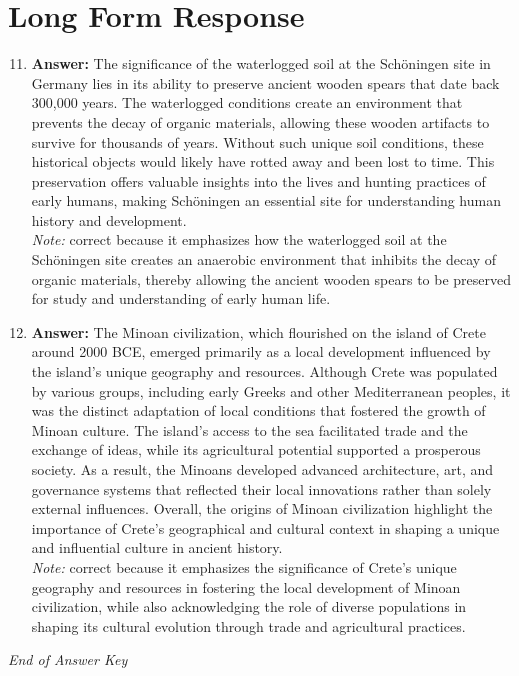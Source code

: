 \documentclass[12pt]{article}
\begin{document}
\section*{Long Form Response}
\begin{enumerate}[label=\arabic*.]
\setcounter{enumi}{10}
\item \textbf{Answer:} The significance of the waterlogged soil at the Schöningen site in Germany lies in its ability to preserve ancient wooden spears that date back 300,000 years. The waterlogged conditions create an environment that prevents the decay of organic materials, allowing these wooden artifacts to survive for thousands of years. Without such unique soil conditions, these historical objects would likely have rotted away and been lost to time. This preservation offers valuable insights into the lives and hunting practices of early humans, making Schöningen an essential site for understanding human history and development.
\\ \textit{Note:} correct because it emphasizes how the waterlogged soil at the Schöningen site creates an anaerobic environment that inhibits the decay of organic materials, thereby allowing the ancient wooden spears to be preserved for study and understanding of early human life.
\item \textbf{Answer:} The Minoan civilization, which flourished on the island of Crete around 2000 BCE, emerged primarily as a local development influenced by the island's unique geography and resources. Although Crete was populated by various groups, including early Greeks and other Mediterranean peoples, it was the distinct adaptation of local conditions that fostered the growth of Minoan culture. The island's access to the sea facilitated trade and the exchange of ideas, while its agricultural potential supported a prosperous society. As a result, the Minoans developed advanced architecture, art, and governance systems that reflected their local innovations rather than solely external influences. Overall, the origins of Minoan civilization highlight the importance of Crete's geographical and cultural context in shaping a unique and influential culture in ancient history.
\\ \textit{Note:} correct because it emphasizes the significance of Crete's unique geography and resources in fostering the local development of Minoan civilization, while also acknowledging the role of diverse populations in shaping its cultural evolution through trade and agricultural practices.
\end{enumerate}

\vfill
\noindent\textit{End of Answer Key}
\end{document}

